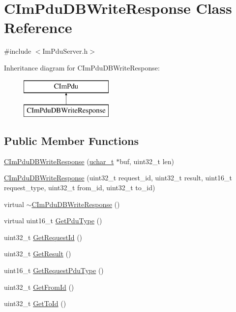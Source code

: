 \hypertarget{class_c_im_pdu_d_b_write_response}{}\section{C\+Im\+Pdu\+D\+B\+Write\+Response Class Reference}
\label{class_c_im_pdu_d_b_write_response}


{\ttfamily \#include $<$Im\+Pdu\+Server.\+h$>$}

Inheritance diagram for C\+Im\+Pdu\+D\+B\+Write\+Response\+:\begin{figure}[H]
\begin{center}
\leavevmode
\includegraphics[height=2.000000cm]{class_c_im_pdu_d_b_write_response}
\end{center}
\end{figure}
\subsection*{Public Member Functions}
\begin{DoxyCompactItemize}
\item 
\hyperlink{class_c_im_pdu_d_b_write_response_a00fb5849207781d606dac4a335967fda}{C\+Im\+Pdu\+D\+B\+Write\+Response} (\hyperlink{base_2ostype_8h_a124ea0f8f4a23a0a286b5582137f0b8d}{uchar\+\_\+t} $\ast$buf, uint32\+\_\+t len)
\item 
\hyperlink{class_c_im_pdu_d_b_write_response_aa5ec94be14f50f66dad921f5322e6fbf}{C\+Im\+Pdu\+D\+B\+Write\+Response} (uint32\+\_\+t request\+\_\+id, uint32\+\_\+t result, uint16\+\_\+t request\+\_\+type, uint32\+\_\+t from\+\_\+id, uint32\+\_\+t to\+\_\+id)
\item 
virtual \hyperlink{class_c_im_pdu_d_b_write_response_ae00e56086efe9ee9f0c1a3a71538353e}{$\sim$\+C\+Im\+Pdu\+D\+B\+Write\+Response} ()
\item 
virtual uint16\+\_\+t \hyperlink{class_c_im_pdu_d_b_write_response_ae2f2b88a7c9024599a6691546edd775b}{Get\+Pdu\+Type} ()
\item 
uint32\+\_\+t \hyperlink{class_c_im_pdu_d_b_write_response_a1f6519f3ef1af305ba5fc6fb6d2361b6}{Get\+Request\+Id} ()
\item 
uint32\+\_\+t \hyperlink{class_c_im_pdu_d_b_write_response_a0bbdb445be37cf1e2858785353ceac0c}{Get\+Result} ()
\item 
uint16\+\_\+t \hyperlink{class_c_im_pdu_d_b_write_response_ac1e3e89ba170212c25980246f859a518}{Get\+Request\+Pdu\+Type} ()
\item 
uint32\+\_\+t \hyperlink{class_c_im_pdu_d_b_write_response_acfb18a10216af9bd923440bcf8ed2566}{Get\+From\+Id} ()
\item 
uint32\+\_\+t \hyperlink{class_c_im_pdu_d_b_write_response_a67b4d3709d95a3c4f95053fa49946465}{Get\+To\+Id} ()
\end{DoxyCompactItemize}
